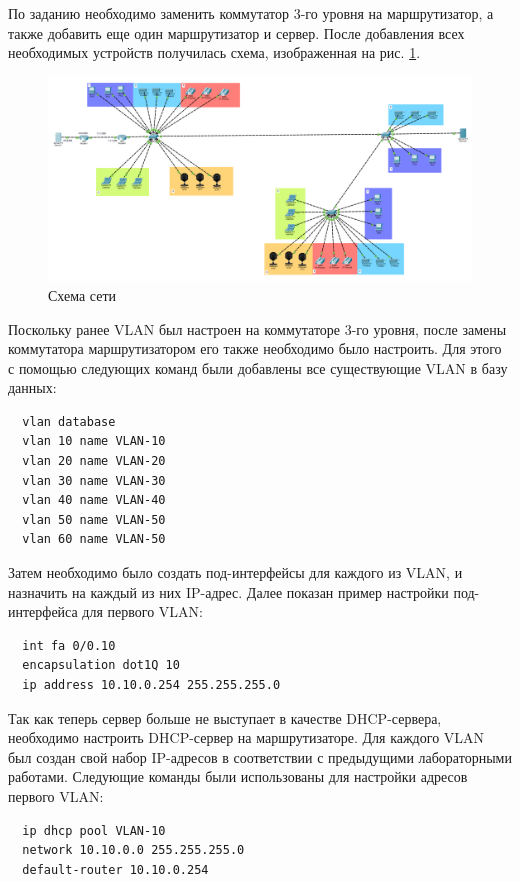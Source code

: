 \documentclass[a4paper, 14pt]{extarticle}
\begin{document}
По заданию необходимо заменить коммутатор 3-го уровня на маршрутизатор, а также
добавить еще один маршрутизатор и сервер. После добавления всех необходимых
устройств получилась схема, изображенная на рис. \ref{fig:scheme}.

\begin{figure}[H]
  \centering
  \includegraphics[width=\textwidth]{images/scheme.png}
  \caption{Схема сети}
  \label{fig:scheme}
\end{figure}

Поскольку ранее VLAN был настроен на коммутаторе 3-го уровня, после замены
коммутатора маршрутизатором его также необходимо было настроить. Для этого с
помощью следующих команд были добавлены все существующие VLAN в базу данных:
\begin{verbatim}
  vlan database
  vlan 10 name VLAN-10
  vlan 20 name VLAN-20
  vlan 30 name VLAN-30
  vlan 40 name VLAN-40
  vlan 50 name VLAN-50
  vlan 60 name VLAN-50
\end{verbatim}

Затем необходимо было создать под-интерфейсы для каждого из VLAN, и назначить на
каждый из них IP-адрес. Далее показан пример настройки под-интерфейса для
первого VLAN:
\begin{verbatim}
  int fa 0/0.10
  encapsulation dot1Q 10
  ip address 10.10.0.254 255.255.255.0
\end{verbatim}

Так как теперь сервер больше не выступает в качестве DHCP-сервера, необходимо
настроить DHCP-сервер на маршрутизаторе. Для каждого VLAN был создан свой набор
IP-адресов в соответствии с предыдущими лабораторными работами. Следующие
команды были использованы для настройки адресов первого VLAN:
\begin{verbatim}
  ip dhcp pool VLAN-10
  network 10.10.0.0 255.255.255.0
  default-router 10.10.0.254
\end{verbatim}
\end{document}
